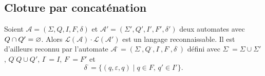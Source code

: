 \subsection{Cloture par concaténation}

\begin{prop}
	Soient $\mathcal{A} = (\Sigma, Q, I, F, \delta)$\/ et $\mathcal{A}' = (\Sigma', Q', I', F', \delta')$\/ deux automates avec $Q \cap Q' = \varnothing$. Alors $\mathcal{L}(\mathcal{A}) \cdot \mathcal{L}(\mathcal{A}')$\/ est un langage reconnaissable. Il est d'ailleurs reconnu par l'automate $\mathcal{A}^\cdot = (\Sigma^\cdot, Q^\cdot, I^\cdot, F^\cdot, \delta^\cdot)$\/ défini avec $\Sigma^\cdot= \Sigma \cup \Sigma'$, $Q^\cdot Q \cup Q'$, $I^\cdot = I$, $F^\cdot = F'$\/ et \[
		\delta^\cdot = \{(q,\varepsilon,q)  \mid q \in F,\, q' \in I'\}.
	\]
\end{prop}


